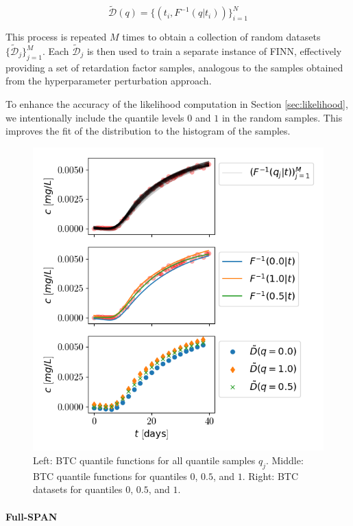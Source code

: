 $$
\tilde{\mathcal{D}}(q) = \{ (t_i, F^{-1}(q | t_i) ) \}_{i=1}^N
$$

This process is repeated $M$ times to obtain a collection of random datasets $\{\tilde{\mathcal{D}}_j\}_{j=1}^M$. Each $\tilde{\mathcal{D}}_j$ is then used to train a separate instance of FINN, effectively providing a set of retardation factor samples, analogous to the samples obtained from the hyperparameter perturbation approach.

To enhance the accuracy of the likelihood computation in Section \vref{sec:likelihood}, we intentionally include the quantile levels $0$ and $1$ in the random samples. This improves the fit of the distribution to the histogram of the samples.

\begin{figure}[h]
    \centering
    \includegraphics{figs/btc_dataspan_quantiles.png}
    \caption{Left: BTC quantile functions for all quantile samples $q_j$. Middle: BTC quantile functions for quantiles $0$, $0.5$, and $1$. Right: BTC datasets for quantiles $0$, $0.5$, and $1$.}
    \label{fig:btc_dataspan_quantiles}
\end{figure}



\paragraph{Full-SPAN}

